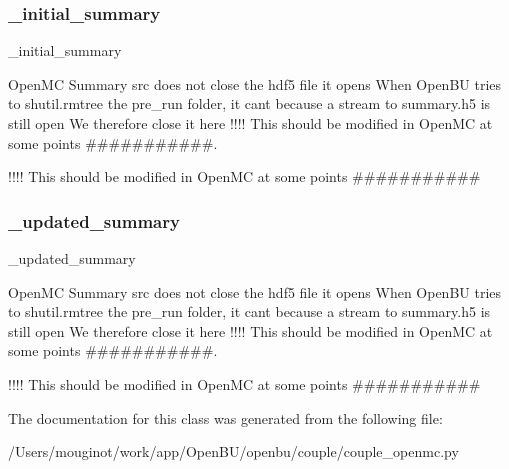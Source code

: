 \subsubsection{\texorpdfstring{\+\_\+initial\+\_\+summary}{\_initial\_summary}}
{\footnotesize\ttfamily \+\_\+initial\+\_\+summary\hspace{0.3cm}{\ttfamily [private]}}



Open\+MC Summary src does not close the hdf5 file it opens When Open\+BU tries to shutil.\+rmtree the pre\+\_\+run folder, it can\textquotesingle{}t because a stream to summary.\+h5 is still open We therefore close it here !!!! This should be modified in Open\+MC at some points \#\#\#\#\#\#\#\#\#\#\#. 

!!!! This should be modified in Open\+MC at some points \#\#\#\#\#\#\#\#\#\#\# \mbox{\label{classopenbu_1_1couple_1_1couple__openmc_1_1_couple__openmc_a07f59174b39819ffcca8a5458a7057a8}} 
\subsubsection{\texorpdfstring{\+\_\+updated\+\_\+summary}{\_updated\_summary}}
{\footnotesize\ttfamily \+\_\+updated\+\_\+summary\hspace{0.3cm}{\ttfamily [private]}}



Open\+MC Summary src does not close the hdf5 file it opens When Open\+BU tries to shutil.\+rmtree the pre\+\_\+run folder, it can\textquotesingle{}t because a stream to summary.\+h5 is still open We therefore close it here !!!! This should be modified in Open\+MC at some points \#\#\#\#\#\#\#\#\#\#\#. 

!!!! This should be modified in Open\+MC at some points \#\#\#\#\#\#\#\#\#\#\# 

The documentation for this class was generated from the following file\+:\begin{DoxyCompactItemize}
\item 
/\+Users/mouginot/work/app/\+Open\+B\+U/openbu/couple/couple\+\_\+openmc.\+py\end{DoxyCompactItemize}
